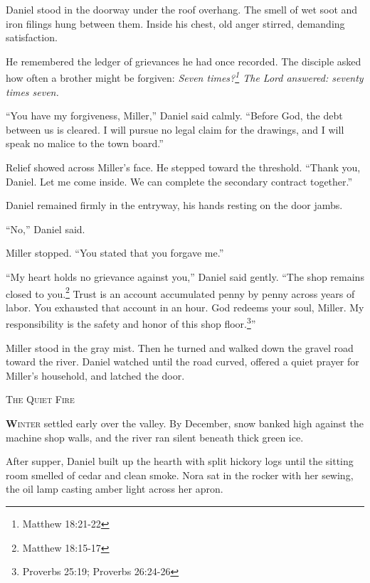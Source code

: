 \documentclass[11pt]{article}
\begin{document}
Daniel stood in the doorway under the roof overhang. The smell of wet soot and iron filings hung between them. Inside his chest, old anger stirred, demanding satisfaction.

He remembered the ledger of grievances he had once recorded. The disciple asked how often a brother might be forgiven: \textit{Seven times?\footnote{Matthew 18:21-22} The Lord answered: seventy times seven.}

``You have my forgiveness, Miller,'' Daniel said calmly. ``Before God, the debt between us is cleared. I will pursue no legal claim for the drawings, and I will speak no malice to the town board.''

Relief showed across Miller’s face. He stepped toward the threshold. ``Thank you, Daniel. Let me come inside. We can complete the secondary contract together.''

Daniel remained firmly in the entryway, his hands resting on the door jambs.

``No,'' Daniel said.

Miller stopped. ``You stated that you forgave me.''

``My heart holds no grievance against you,'' Daniel said gently. ``The shop remains closed to you.\footnote{Matthew 18:15-17} Trust is an account accumulated penny by penny across years of labor. You exhausted that account in an hour. God redeems your soul, Miller. My responsibility is the safety and honor of this shop floor.\footnote{Proverbs 25:19; Proverbs 26:24-26}''

Miller stood in the gray mist. Then he turned and walked down the gravel road toward the river. Daniel watched until the road curved, offered a quiet prayer for Miller’s household, and latched the door.

\newpage

\begin{center}
    {\scshape\large The Quiet Fire}\par
    \vspace{0.2in}
\end{center}

\lettrine[lines=3,findent=3pt,nindent=0pt]{\textbf{W}}{inter} settled early over the valley. By December, snow banked high against the machine shop walls, and the river ran silent beneath thick green ice.

After supper, Daniel built up the hearth with split hickory logs until the sitting room smelled of cedar and clean smoke. Nora sat in the rocker with her sewing, the oil lamp casting amber light across her apron.
\end{document}

